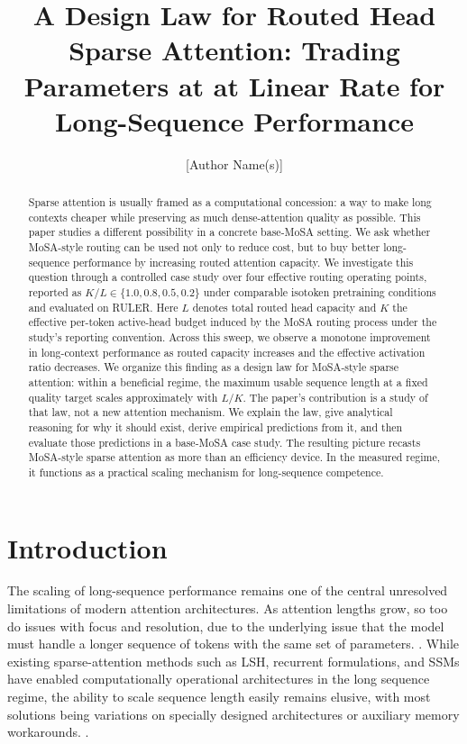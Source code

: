 \documentclass[11pt]{article}
\title{A Design Law for Routed Head Sparse Attention: Trading Parameters at at Linear Rate for Long-Sequence Performance}
\author{[Author Name(s)]}
\date{}
\begin{document}
\maketitle

\begin{abstract}

Sparse attention is usually framed as a computational concession: a way to make long contexts cheaper while preserving as much dense-attention quality as possible. This paper studies a different possibility in a concrete base-MoSA setting. We ask whether MoSA-style routing can be used not only to reduce cost, but to buy better long-sequence performance by increasing routed attention capacity. We investigate this question through a controlled case study over four effective routing operating points, reported as $K/L \in \{1.0, 0.8, 0.5, 0.2\}$ under comparable isotoken pretraining conditions and evaluated on RULER. Here $L$ denotes total routed head capacity and $K$ the effective per-token active-head budget induced by the MoSA routing process under the study's reporting convention. Across this sweep, we observe a monotone improvement in long-context performance as routed capacity increases and the effective activation ratio decreases. We organize this finding as a design law for MoSA-style sparse attention: within a beneficial regime, the maximum usable sequence length at a fixed quality target scales approximately with $L/K$. The paper's contribution is a study of that law, not a new attention mechanism. We explain the law, give analytical reasoning for why it should exist, derive empirical predictions from it, and then evaluate those predictions in a base-MoSA case study. The resulting picture recasts MoSA-style sparse attention as more than an efficiency device. In the measured regime, it functions as a practical scaling mechanism for long-sequence competence.
\end{abstract}

\section{Introduction}

The scaling of long-sequence performance remains one of the central unresolved limitations of modern attention architectures. As attention lengths grow, so too do issues with focus and resolution, due to the underlying issue that the model must handle a longer sequence of tokens with the same set of parameters. \citep{liu2024lost, vasylenko2026longcontextgeneralizationsparseattention}. While existing sparse-attention methods such as LSH, recurrent formulations, and SSMs have enabled computationally operational architectures in the long sequence regime, the ability to scale sequence length easily remains elusive, with most solutions being variations on specially designed architectures or auxiliary memory workarounds. \citep{kitaev2020reformer, katharopoulos2020transformers, gu2022efficiently, piekos2025mosa}.
\end{document}
